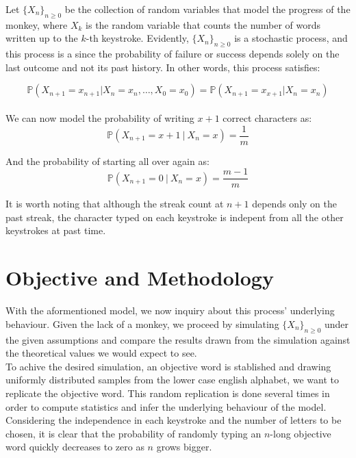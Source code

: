\documentclass{article}
\newcommand{\SP}{\{X_n\}_{n\geq 0}}
\begin{document}
Let $\SP$ be the collection of random variables that model the progress of the monkey, where $X_k$ is the random variable that counts the number of  words written up to the $k$-th keystroke. Evidently, $\SP$ is a stochastic process, and this process is a  since the probability of failure or success depends solely on the last outcome and not its past history. In other words, this process satisfies:

\begin{equation} \label{mkv_prop}
    \mathbb{P}(X_{n+1}=x_{n+1} | X_{n}=x_{n},\ldots, X_{0}=x_{0}) = \mathbb{P}(X_{n+1}=x_{x+1} | X_{n}=x_{n})
\end{equation}\\

We can now model the probability of writing $x+1$ correct characters as:
\begin{equation}
\mathbb{P}(X_{n+1} = x+1 \ | \ X_n=x) = \frac{1}{m}
\end{equation}

And the probability of starting all over again as:
\begin{equation}
\mathbb{P}(X_{n+1} = 0 \ | \ X_n=x) = \frac{m - 1}{m}
\end{equation}

It is worth noting that although the streak count at $n+1$ depends only on the past streak, the character typed on each keystroke is indepent from all the other keystrokes at past time.

\section{Objective and Methodology}
With the aformentioned model, we now inquiry about this process' underlying behaviour. Given the lack of a monkey, we proceed by simulating $\SP$ under the given assumptions and compare the results drawn from the simulation against the theoretical values we would expect to see.\\

To achive the desired simulation, an objective word is stablished and drawing uniformly distributed samples from the lower case english alphabet, we want to replicate the objective word. This random replication is done several times in order to compute statistics and infer the underlying behaviour of the model.\\

Considering the independence in each keystroke and the number of letters to be chosen, it is clear that the probability of randomly typing an $n$-long objective word quickly decreases to zero as $n$ grows bigger.
\end{document}
